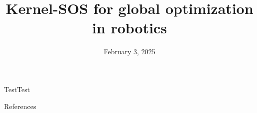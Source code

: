 \documentclass{cs-slides}
\title{\textbf{Kernel-SOS for global optimization in robotics}}
\date{February 3, 2025}
\begin{document}
\begin{frame}{Test}{Test}

\end{frame}

\begin{frame}[allowframebreaks]{References}
    \nocite{*}
    \printbibliography
\end{frame}
\end{document}

